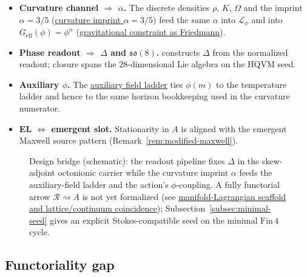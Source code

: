 \documentclass[11pt]{amsart}
\begin{document}
\begin{itemize}
\item \textbf{Curvature channel \(\Rightarrow\) \(\alpha\).} The discrete densities \(\rho\), \(K\), \(\Omega\) and the imprint \(\alpha=3/5\) (\hyperref[lean:imprint-alpha]{curvature imprint \(\alpha=3/5\)}) feed the same \(\alpha\) into \(\mathcal{L}_\phi\) and into \(G_{\mathrm{eff}}(\phi)=\phi^{\alpha}\) (\hyperref[lean:S-grav]{gravitational constraint as Friedmann}).
\item \textbf{Phase readout \(\Rightarrow\) \(\Delta\) and \(\mathfrak{so}(8)\).} \cite{hqiv-so8-paper} constructs \(\Delta\) from the normalized readout; closure spans the \(28\)-dimensional Lie algebra on the HQVM seed.
\item \textbf{Auxiliary \(\phi\).} The \hyperref[lean:phi-ladder]{auxiliary field ladder} ties \(\phi(m)\) to the temperature ladder and hence to the same horizon bookkeeping used in the curvature numerator.
\item \textbf{EL \(\Leftrightarrow\) emergent slot.} Stationarity in \(A\) is aligned with the emergent Maxwell source pattern (Remark~\ref{rem:modified-maxwell}).
\end{itemize}

\begin{figure}[ht]
\centering
{}
\caption{Design bridge (schematic): the readout pipeline fixes \(\Delta\) in the skew-adjoint octonionic carrier while the curvature imprint \(\alpha\) feeds the auxiliary-field ladder and the action's \(\phi\)-coupling. A fully functorial arrow \(\mathcal{R}\rightsquigarrow A\) is not yet formalized (see \hyperref[lean:scaffold-bridge]{manifold-Lagrangian scaffold and lattice/continuum coincidence}); Subsection~\ref{subsec:minimal-seed} gives an explicit Stokes-compatible seed on the minimal \(\mathrm{Fin}\,4\) cycle.}
\label{fig:bridge}
\end{figure}

\subsection{Functoriality gap}
\end{document}
